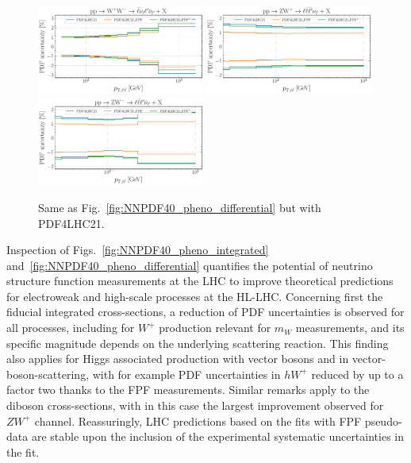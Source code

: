 \begin{figure}[htbp]
	\includegraphics[width=0.49\textwidth]{plots/LHCpheno/NNPDF_WPWM_14TEV_40_PHENO-global-pdf4lhc21.pdf}
	\includegraphics[width=0.49\textwidth]{plots/LHCpheno/NNPDF_WPZ_14TEV_40_PHENO-global-pdf4lhc21.pdf}
	\includegraphics[width=0.49\textwidth]{plots/LHCpheno/NNPDF_WMZ_14TEV_40_PHENO-global-pdf4lhc21.pdf}
	\caption{
		Same as Fig.~\ref{fig:NNPDF40_pheno_differential} but with PDF4LHC21.
	}
	\label{fig:PDF4LHC21_pheno_differential}
\end{figure}

Inspection of Figs.~\ref{fig:NNPDF40_pheno_integrated} and~\ref{fig:NNPDF40_pheno_differential}
quantifies the potential of neutrino structure function measurements at the LHC
to improve theoretical predictions for electroweak and high-scale processes at the HL-LHC.
%
Concerning first the fiducial integrated cross-sections, a reduction of PDF
uncertainties is observed for all processes,
including for $W^+$ production relevant for $m_W$ measurements, and its specific  magnitude depends
on the underlying scattering reaction.
%
This finding also applies for Higgs associated production with vector bosons and in vector-boson-scattering,
with for example
PDF uncertainties in $hW^+$ reduced by up to a factor two thanks to the FPF measurements.
%
Similar remarks apply to the diboson cross-sections, with in this case the largest
improvement observed for $ZW^+$ channel.
%
Reassuringly, LHC predictions based on the fits with FPF pseudo-data are stable
upon the inclusion of the experimental systematic uncertainties in the fit.

